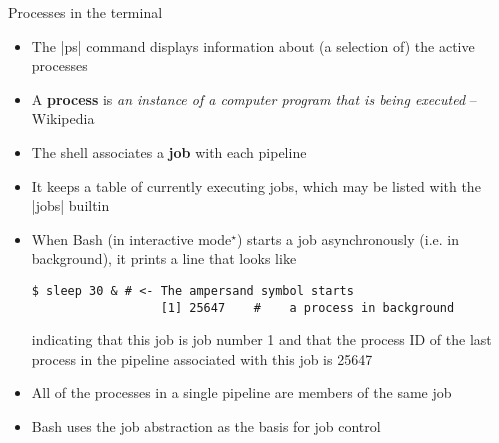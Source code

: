 
\begin{frame}[fragile]{Processes in the terminal}{}
    \vspace{-3mm}
    \begin{itemize}
        \item The \bash|ps| command displays information about (a selection of) the active processes
        \item A \alert{\textbf{process}} is \emph{\guillemotleft an instance of a computer program that is being executed\guillemotright} -- Wikipedia
        \item The shell associates a \alert{\textbf{job}} with each pipeline
        \item It keeps a table of currently executing jobs, which may be listed with the \bash|jobs| builtin
        \item When Bash (in interactive mode$^\star$) starts a job asynchronously (i.e. in background), it prints a line that looks like
              \begin{lstlisting}[style=MyBash, numbers=none, aboveskip=2mm, belowskip=-5mm, xrightmargin=25mm]
                  $ sleep 30 & # <- The ampersand symbol starts
                  [1] 25647    #    a process in background
              \end{lstlisting}
              indicating that this job is job number 1 and that the process ID of the last process in the pipeline associated with this job is 25647
        \item All of the processes in a single pipeline are members of the same job
        \item Bash uses the job abstraction as the basis for job control
    \end{itemize}
\end{frame}
